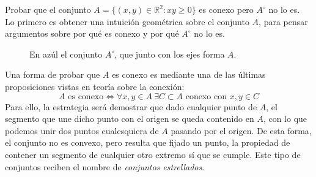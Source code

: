 \begin{ejercicio}\label{ej:rel4_10}
Probar que el conjunto \( A = \{ (x,y) \in \mathbb{R}^2 : xy \geq 0 \} \) es conexo pero \( A^\circ \) no lo es.\\

\noindent
Lo primero es obtener una intuición geométrica sobre el conjunto $A$, para pensar argumentos sobre por qué es conexo y por qué $A^\circ$ no lo es.
\begin{figure}[H]
    \centering
{}
    \caption{En azúl el conjunto $A^\circ$, que junto con los ejes forma $A$.}
\end{figure}
Una forma de probar que $A$ es conexo es mediante una de las últimas proposiciones vistas en teoría sobre la conexión:
\begin{equation*}
    A \text{\ es conexo} \Longleftrightarrow \forall x,y\in A~\exists C\subset A \text{\ conexo con\ } x,y\in C
\end{equation*}
Para ello, la estrategia será demostrar que dado cualquier punto de $A$, el segmento que une dicho punto con el origen se queda contenido en $A$, con lo que podemos unir dos puntos cualesquiera de $A$ pasando por el origen. De esta forma, el conjunto no es convexo, pero resulta que fijado un punto, la propiedad de contener un segmento de cualquier otro extremo sí que se cumple. Este tipo de conjuntos reciben el nombre de \textit{conjuntos estrellados}.\\


\end{ejercicio}

